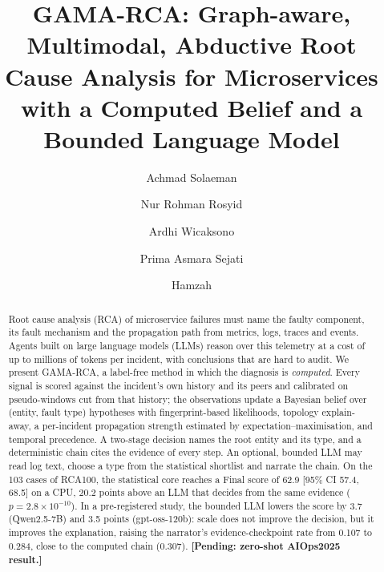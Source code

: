 \documentclass[preprint,12pt]{elsarticle}
\newcommand{\pending}[1]{\textcolor{pend}{\textbf{[Pending: #1]}}}
\newcommand{\gama}{GAMA-RCA}
\begin{document}
\begin{frontmatter}

\title{\gama: Graph-aware, Multimodal, Abductive Root Cause Analysis for Microservices with a Computed Belief and a Bounded Language Model}

\author[ugm]{Achmad Solaeman}
\author[ugm]{Nur Rohman Rosyid}
\author[ugm]{Ardhi Wicaksono}
\author[ugm]{Prima Asmara Sejati}
\author[mpki]{Hamzah}

\begin{abstract}
Root cause analysis (RCA) of microservice failures must name the faulty component, its fault mechanism and the propagation path
from metrics, logs, traces and events. Agents built on large language models (LLMs) reason over this telemetry at a cost of up to
millions of tokens per incident, with conclusions that are hard to audit. We present \gama{}, a label-free method in which the
diagnosis is \emph{computed}. Every signal is scored against the incident's own history and its peers and calibrated on
pseudo-windows cut from that history; the observations update a Bayesian belief over (entity, fault type) hypotheses with
fingerprint-based likelihoods, topology explain-away, a per-incident propagation strength estimated by expectation--maximisation,
and temporal precedence. A two-stage decision names the root entity and its type, and a deterministic chain cites the evidence of
every step. An optional, bounded LLM may read log text, choose a type from the statistical shortlist and narrate the chain. On the
103 cases of RCA100, the statistical core reaches a Final score of 62.9 [95\% CI 57.4, 68.5] on a CPU, 20.2 points above an LLM that
decides from the same evidence ($p=2.8\times10^{-10}$). In a pre-registered study, the bounded LLM lowers the score by 3.7
(Qwen2.5-7B) and 3.5 points (gpt-oss-120b): scale does not improve the decision, but it improves the explanation, raising the
narrator's evidence-checkpoint rate from 0.107 to 0.284, close to the computed chain (0.307). \pending{zero-shot AIOps2025 result.}
\end{abstract}


\end{frontmatter}
\end{document}
